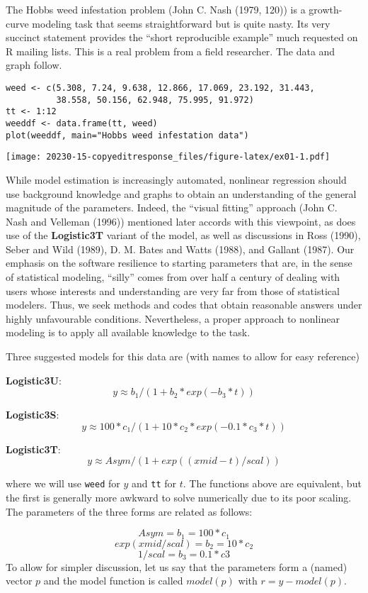 The Hobbs weed infestation problem (John C. Nash (1979, 120)) is a growth-curve modeling
task that seems straightforward but is quite nasty. Its very succinct statement
provides the ``short reproducible example'' much requested on R mailing lists.
This is a real problem from a field researcher. The data and graph follow.

\begin{verbatim}
weed <- c(5.308, 7.24, 9.638, 12.866, 17.069, 23.192, 31.443,
          38.558, 50.156, 62.948, 75.995, 91.972)
tt <- 1:12
weeddf <- data.frame(tt, weed)
plot(weeddf, main="Hobbs weed infestation data")
\end{verbatim}

\texttt{[image: 20230-15-copyeditresponse\_files/figure-latex/ex01-1.pdf]}

While model estimation is increasingly automated, nonlinear regression
should use background knowledge and graphs to obtain an understanding of
the general magnitude of the parameters. Indeed, the ``visual fitting'' approach
(John C. Nash and Velleman (1996)) mentioned later accords with this viewpoint, as does use
of the \textbf{Logistic3T} variant of the model, as well as discussions in Ross (1990),
Seber and Wild (1989), D. M. Bates and Watts (1988), and Gallant (1987).
Our emphasis on the software resilience to starting parameters that are, in the
sense of statistical modeling, ``silly'' comes from over half a century of dealing
with users whose interests and understanding are very far from those of statistical
modelers. Thus, we seek methods and codes that obtain reasonable answers under
highly unfavourable conditions. Nevertheless, a proper approach to
nonlinear modeling is to apply all available knowledge to the task.

Three suggested models for this data are (with names to allow for easy reference)

\textbf{Logistic3U}:
\[  y \approx  b_1 / (1 + b_2 * exp(- b_3 * t)) \]

\textbf{Logistic3S}:
\[ y \approx  100 * c_1 / (1 + 10 * c_2 * exp(- 0.1 * c_3 * t)) \]

\textbf{Logistic3T}:
\[ y \approx Asym / (1 + exp((xmid - t)/scal)) \]

where we will use \texttt{weed} for \(y\) and \texttt{tt} for \(t\).
The functions above are equivalent, but the first is generally more awkward
to solve numerically due to its poor scaling. The parameters of the three forms
are related as follows:

\[   Asym =  b_1 = 100 * c_1 \]
\[ exp(xmid/scal)  =  b_2 = 10 * c_2 \]
\[ 1/scal  =  b_3 = 0.1*c3 \]
To allow for simpler discussion, let us say that the parameters form a (named) vector
\(p\) and the model function is called \(model(p)\) with \(r = y - model(p)\).


